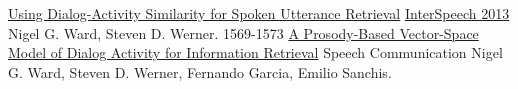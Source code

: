 \documentclass[]{friggeri-cv} %
\begin{document}
\begin{entrylist}
\entry
{}
{\href{http://www.isca-speech.org/archive/interspeech_2013/i13_1569.html}{Using Dialog-Activity Similarity for Spoken Utterance Retrieval}}
{\href{http://www.isca-speech.org/archive/interspeech_2013/}{InterSpeech 2013}}
{\small{Nigel G. Ward, Steven D. Werner.} 1569-1573}
\entry
{}
{\href{http://www.cs.utep.edu/nigel/abstracts/prosody-ir.html}{A Prosody-Based Vector-Space Model of Dialog Activity for Information Retrieval}}
{Speech Communication}
{\small{Nigel G. Ward, Steven D. Werner, Fernando Garcia, Emilio Sanchis.}}
\end{entrylist}

\newpage
\clearpage
\end{document}
